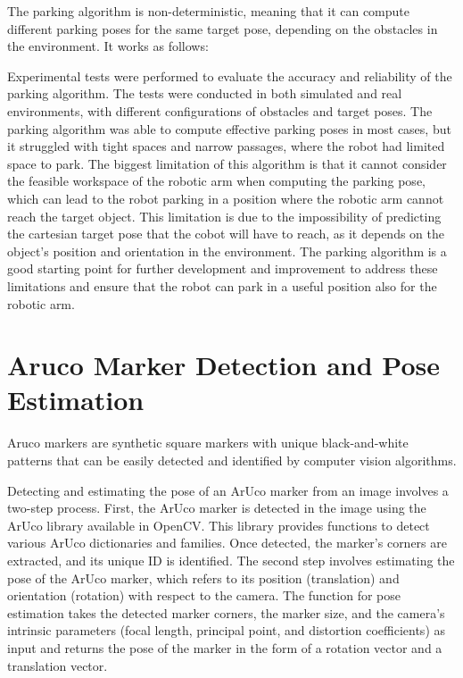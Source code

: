 The parking algorithm is non-deterministic, meaning that it can compute different parking poses for the same target
pose, depending on the obstacles in the environment. It works as follows:


Experimental tests were performed to evaluate the accuracy and reliability of the parking algorithm.
The tests were conducted in both simulated and real environments, with different configurations of obstacles
and target poses. The parking algorithm was able to compute effective parking poses in most cases,
but it struggled with tight spaces and narrow passages, where the robot had limited space to park.
The biggest limitation of this algorithm is that it cannot consider the feasible workspace of the robotic arm
when computing the parking pose, which can lead to the robot parking in a position where the robotic arm
cannot reach the target object. This limitation is due to the impossibility of predicting the cartesian
target pose that the cobot will have to reach, as it depends on the object's position and orientation
in the environment. The parking algorithm is a good starting point for further development and improvement
to address these limitations and ensure that the robot can park in a useful position also for the robotic arm.

\section{Aruco Marker Detection and Pose Estimation}

Aruco markers are synthetic square markers with unique black-and-white patterns that can be easily detected
and identified by computer vision algorithms.

Detecting and estimating the pose of an ArUco marker from an image involves a two-step process.
First, the ArUco marker is detected in the image using the ArUco library available in OpenCV. 
This library provides functions to detect various ArUco dictionaries and families. 
Once detected, the marker's corners are extracted, and its unique ID is identified. 
The second step involves estimating the pose of the ArUco marker, which refers to its position 
(translation) and orientation (rotation) with respect to the camera. The function for pose estimation 
takes the detected marker corners, the marker size, and the camera's intrinsic parameters (focal length,
principal point, and distortion coefficients) as input and returns the pose of the marker in the form of a rotation
vector and a translation vector.

